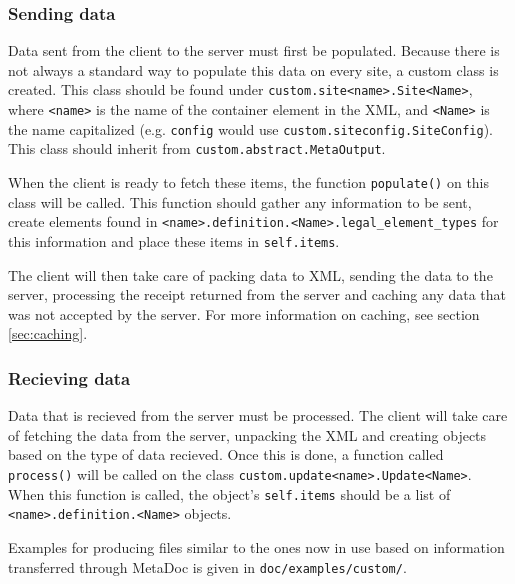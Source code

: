 \subsubsection{Sending data}
\label{sec:customizing_client_send}
Data sent from the client to the server must first be populated. Because there
is not always a standard way to populate this data on every site, a custom
class is created. This class should be found under
\texttt{custom.site<name>.Site<Name>}, where \texttt{<name>} is the name of the
container element in the XML, and \texttt{<Name>} is the name capitalized (e.g. 
\texttt{config} would use \texttt{custom.siteconfig.SiteConfig}). This class
should inherit from \texttt{custom.abstract.MetaOutput}. 

When the client is ready to fetch these items, the function \texttt{populate()}
on this class will be called. This function should gather any information to be
sent, create elements found in
\texttt{<name>.definition.<Name>.legal\_element\_types} for this information 
and place these items in \texttt{self.items}. 

The client will then take care of packing data to XML, sending the data to the
server, processing the receipt returned from the server and caching any data
that was not accepted by the server. For more information on caching, see
section \ref{sec:caching}.

\subsubsection{Recieving data}
\label{sec:customizing_client_recieve}
Data that is recieved from the server must be processed. The client will take
care of fetching the data from the server, unpacking the XML and creating
objects based on the type of data recieved. Once this is done, a function
called \texttt{process()} will be called on the class
\texttt{custom.update<name>.Update<Name>}. When this function is called, the 
object's \texttt{self.items} should be a list of 
\texttt{<name>.definition.<Name>} objects.

Examples for producing files similar to the ones now in use based on
information transferred through MetaDoc is given in
\texttt{doc/examples/custom/}.
